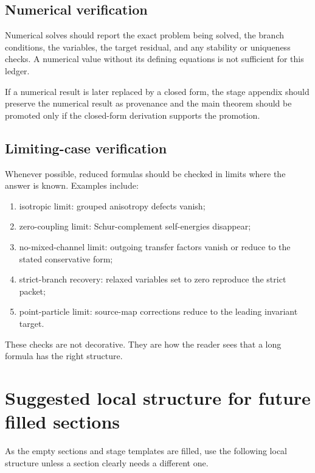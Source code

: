 \subsection{Numerical verification}
\label{subsec:numerical-verification}

Numerical solves should report the exact problem being solved, the branch conditions, the variables, the target residual, and any stability or uniqueness checks.  A numerical value without its defining equations is not sufficient for this ledger.

If a numerical result is later replaced by a closed form, the stage appendix should preserve the numerical result as provenance and the main theorem should be promoted only if the closed-form derivation supports the promotion.

\subsection{Limiting-case verification}
\label{subsec:limiting-case-verification}

Whenever possible, reduced formulas should be checked in limits where the answer is known.  Examples include:
\begin{enumerate}[leftmargin=2.2em]
  \item isotropic limit: grouped anisotropy defects vanish;
  \item zero-coupling limit: Schur-complement self-energies disappear;
  \item no-mixed-channel limit: outgoing transfer factors vanish or reduce to the stated conservative form;
  \item strict-branch recovery: relaxed variables set to zero reproduce the strict packet;
  \item point-particle limit: source-map corrections reduce to the leading invariant target.
\end{enumerate}

These checks are not decorative.  They are how the reader sees that a long formula has the right structure.

\section{Suggested local structure for future filled sections}
\label{sec:suggested-local-structure}

As the empty sections and stage templates are filled, use the following local structure unless a section clearly needs a different one.

